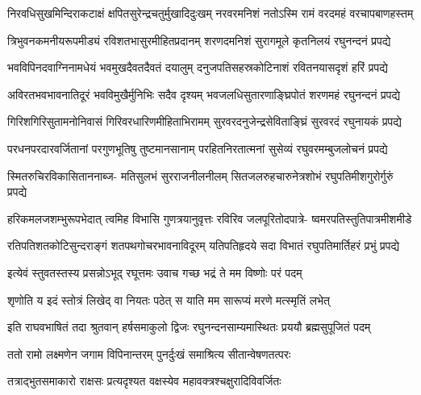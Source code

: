 \fourlineindentedshloka
{निरवधिसुखमिन्दिराकटाक्षं}
{क्षपितसुरेन्द्रचतुर्मुखादिदुःखम्}
{नरवरमनिशं नतोऽस्मि रामं}
{वरदमहं वरचापबाणहस्तम्} %

\fourlineindentedshloka
{त्रिभुवनकमनीयरूपमीड्यं}
{रविशतभासुरमीहितप्रदानम्}
{शरणदमनिशं सुरागमूले}
{कृतनिलयं रघुनन्दनं प्रपद्ये} %

\fourlineindentedshloka
{भवविपिनदवाग्निनामधेयं}
{भवमुखदैवतदैवतं दयालुम्}
{दनुजपतिसहस्रकोटिनाशं}
{रवितनयासदृशं हरिं प्रपद्ये} %

\fourlineindentedshloka
{अविरतभवभावनातिदूरं}
{भवविमुखैर्मुनिभिः सदैव दृश्यम्}
{भवजलधिसुतारणाङ्घ्रिपोतं}
{शरणमहं रघुनन्दनं प्रपद्ये} %

\fourlineindentedshloka
{गिरिशगिरिसुतामनोनिवासं}
{गिरिवरधारिणमीहिताभिरामम्}
{सुरवरदनुजेन्द्रसेविताङ्घ्रिं}
{सुरवरदं रघुनायकं प्रपद्ये} %

\fourlineindentedshloka
{परधनपरदारवर्जितानां}
{परगुणभूतिषु तुष्टमानसानाम्}
{परहितनिरतात्मनां सुसेव्यं}
{रघुवरमम्बुजलोचनं प्रपद्ये} %

\fourlineindentedshloka
{स्मितरुचिरविकासिताननाब्ज-}
{मतिसुलभं सुरराजनीलनीलम्}
{सितजलरुहचारुनेत्रशोभं}
{रघुपतिमीशगुरोर्गुरुं प्रपद्ये} %

\fourlineindentedshloka
{हरिकमलजशम्भुरूपभेदात्}
{त्वमिह विभासि गुणत्रयानुवृत्तः}
{रविरिव जलपूरितोदपात्रे-}
{ष्वमरपतिस्तुतिपात्रमीशमीडे} %

\fourlineindentedshloka
{रतिपतिशतकोटिसुन्दराङ्गं}
{शतपथगोचरभावनाविदूरम्}
{यतिपतिहृदये सदा विभातं}
{रघुपतिमार्तिहरं प्रभुं प्रपद्ये} %

\twolineshloka
{इत्येवं स्तुवतस्तस्य प्रसन्नोऽभूद् रघूत्तमः}
{उवाच गच्छ भद्रं ते मम विष्णोः परं पदम्} %

\twolineshloka
{शृणोति य इदं स्तोत्रं लिखेद् वा नियतः पठेत्}
{स याति मम सारूप्यं मरणे मत्स्मृतिं लभेत्} %

\fourlineindentedshloka
{इति राघवभाषितं तदा}
{श्रुतवान् हर्षसमाकुलो द्विजः}
{रघुनन्दनसाम्यमास्थितः}
{प्रययौ ब्रह्मसुपूजितं पदम्} %






\twolineshloka
{ततो रामो लक्ष्मणेन जगाम विपिनान्तरम्}
{पुनर्दुःखं समाश्रित्य सीतान्वेषणतत्परः} %

\twolineshloka
{तत्राद्भुतसमाकारो राक्षसः प्रत्यदृश्यत}
{वक्षस्येव महावक्त्रश्चक्षुरादिविवर्जितः} %

